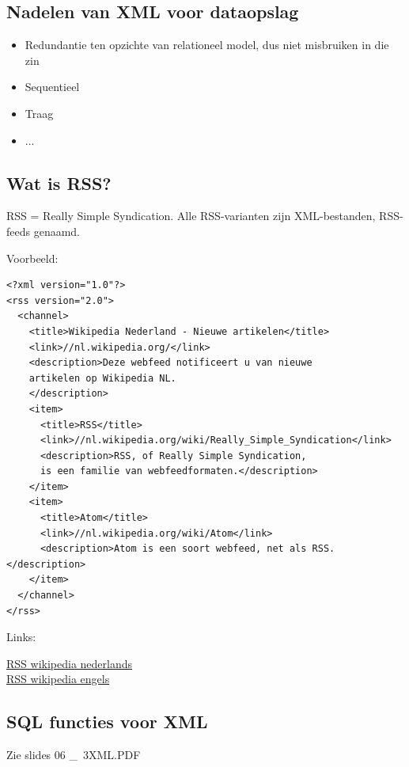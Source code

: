 \subsection{Nadelen van XML voor dataopslag}

\begin{itemize}
\item Redundantie ten opzichte van relationeel model, dus niet misbruiken in die zin
\item Sequentieel
\item Traag
\item ...
\end{itemize}

\subsection{Wat is RSS?}
RSS = Really Simple Syndication.
Alle RSS-varianten zijn XML-bestanden, RSS-feeds genaamd.

Voorbeeld:

\begin{verbatim}
<?xml version="1.0"?>
<rss version="2.0">
  <channel>
    <title>Wikipedia Nederland - Nieuwe artikelen</title> 
    <link>//nl.wikipedia.org/</link> 
    <description>Deze webfeed notificeert u van nieuwe 
    artikelen op Wikipedia NL.
    </description>
    <item>                                                                                                                                                 
      <title>RSS</title> 
      <link>//nl.wikipedia.org/wiki/Really_Simple_Syndication</link> 
      <description>RSS, of Really Simple Syndication,
      is een familie van webfeedformaten.</description> 
    </item>
    <item>
      <title>Atom</title> 
      <link>//nl.wikipedia.org/wiki/Atom</link> 
      <description>Atom is een soort webfeed, net als RSS.</description> 
    </item>
  </channel>
</rss>
\end{verbatim}

\noindent Links:

\noindent \href{https://nl.wikipedia.org/wiki/Really_Simple_Syndication}{RSS wikipedia nederlands}\\
\href{https://en.wikipedia.org/wiki/RSS}{RSS wikipedia engels}

\subsection{SQL functies voor XML}

Zie slides 06 \_\ 3XML.PDF